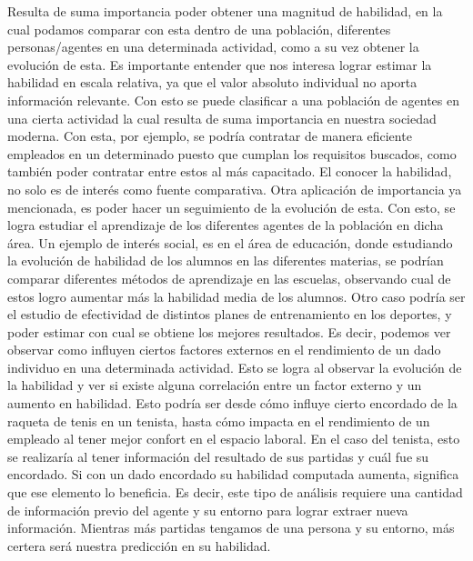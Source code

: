 \documentclass[11pt,twoside, spanish]{report} %
\begin{document}
Resulta de suma importancia poder obtener una magnitud de habilidad, en la cual podamos comparar con esta dentro de una poblaci\'on, diferentes personas/agentes en una determinada actividad, como a su vez obtener la evoluci\'on de esta.
Es importante entender que nos interesa lograr estimar la habilidad en escala relativa, ya que el valor absoluto individual no aporta informaci\'on relevante.
Con esto se puede clasificar a una poblaci\'on de agentes en una cierta actividad la cual resulta de suma importancia en nuestra sociedad moderna.
Con esta, por ejemplo, se podr\'ia contratar de manera eficiente empleados en un determinado puesto que cumplan los requisitos buscados, como tambi\'en poder contratar entre estos al m\'as capacitado.
El conocer la habilidad, no solo es de inter\'es como fuente comparativa.
Otra aplicaci\'on de importancia ya mencionada, es poder hacer un seguimiento de la evoluci\'on de esta.
Con esto, se logra estudiar el aprendizaje de los diferentes agentes de la poblaci\'on en dicha \'area.
Un ejemplo de inter\'es social, es en el \'area de educaci\'on, donde estudiando la evoluci\'on de habilidad de los alumnos en las diferentes materias, se podr\'ian comparar diferentes m\'etodos de aprendizaje en las escuelas, observando cual de estos logro aumentar m\'as la habilidad media de los alumnos.
Otro caso podr\'ia ser el estudio de efectividad de distintos planes de entrenamiento en los deportes, y poder estimar con cual se obtiene los mejores resultados.
Es decir, podemos ver observar como influyen ciertos factores externos en el rendimiento de un dado individuo en una determinada actividad.
Esto se logra al observar la evoluci\'on de la habilidad y ver si existe alguna correlaci\'on entre un factor externo y un aumento en habilidad.
Esto podr\'ia ser desde c\'omo influye cierto encordado de la raqueta de tenis en un tenista, hasta c\'omo impacta en el rendimiento de un empleado al tener mejor confort en el espacio laboral.
En el caso del tenista, esto se realizar\'ia al tener informaci\'on del resultado de sus partidas y cu\'al fue su encordado.
Si con un dado encordado su habilidad computada aumenta, significa que ese elemento lo beneficia.
Es decir, este tipo de an\'alisis requiere una cantidad de informaci\'on previo del agente y su entorno para lograr extraer nueva informaci\'on.
Mientras m\'as partidas tengamos de una persona y su entorno, m\'as certera ser\'a nuestra predicci\'on en su habilidad.
\end{document}
